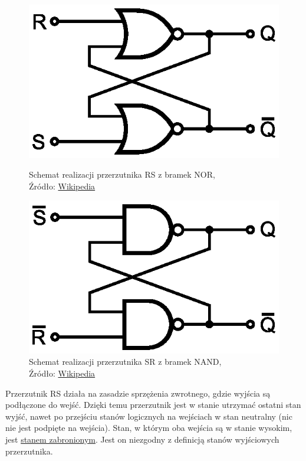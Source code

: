 \documentclass{article}
\begin{document}
      \begin{figure}[!ht]
        \begin{minipage}{.5\textwidth}
            \centering
            \includegraphics[scale=0.87]{grafiki/RS_NOR.eps}
            \caption{Schemat realizacji przerzutnika RS z bramek NOR,
            \\Źródło: \href{https://pl.wikipedia.org/wiki/Plik:RS_Flip-flop_(NOR).svg}{Wikipedia}}
        \end{minipage}
        \begin{minipage}{.5\textwidth}
            \centering
            \includegraphics[scale=0.87]{grafiki/SR_NAND.eps} 
            \caption{Schemat realizacji przerzutnika SR z bramek NAND,
            \\Źródło: \href{https://pl.wikipedia.org/wiki/Plik:SR_Flip-flop_Diagram.svg}{Wikipedia}}
        \end{minipage}
      \end{figure}

      Przerzutnik RS działa na zasadzie sprzężenia zwrotnego, gdzie wyjścia są podłączone do wejść. Dzięki temu przerzutnik jest w stanie utrzymać ostatni stan wyjść, nawet po przejściu stanów logicznych na wejściach w stan neutralny (nic nie jest podpięte na wejścia).
      Stan, w którym oba wejścia są w stanie wysokim, jest \underline{stanem zabronionym}. Jest on niezgodny z 
      definicją stanów wyjściowych przerzutnika.
\end{document}
